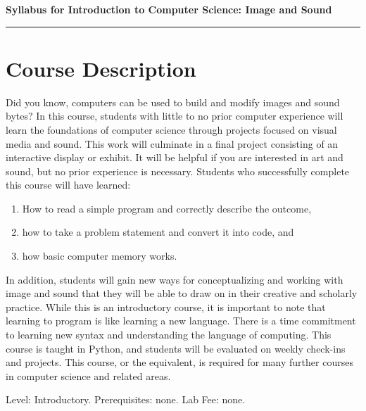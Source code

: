 \documentclass[12pt]{article}
\begin{document}
\begin{center}
  {\Large {\bf Syllabus for Introduction to Computer Science: Image and Sound}}  
\end{center}

\vspace{5pt}
\hrule
\vspace{5pt}

\section{Course Description}
Did you know, computers can be used to build and modify images and sound bytes? In this course, students with little to no prior computer experience will learn the foundations of computer science through projects focused on visual media and sound. This work will culminate in a final project consisting of an interactive display or exhibit. It will be helpful if you are interested in art and sound, but no prior experience is necessary. Students who successfully complete this course will have learned:
\begin{enumerate}
\item How to read a simple program and correctly describe the outcome, 
\item how to take a problem statement and convert it into code, and 
\item how basic computer memory works.
\end{enumerate}
In addition, students will gain new ways for conceptualizing and working with image and sound that they will be able to draw on in their creative and scholarly practice. While this is an introductory course, it is important to note that learning to program is like learning a new language. There is a time commitment to learning new syntax and understanding the language of computing. This course is taught in Python, and students will be evaluated on weekly check-ins and projects. This course, or the equivalent, is required for many further courses in computer science and related areas. 

Level: Introductory. 
Prerequisites: none. 
Lab Fee: none. 
\end{document}
